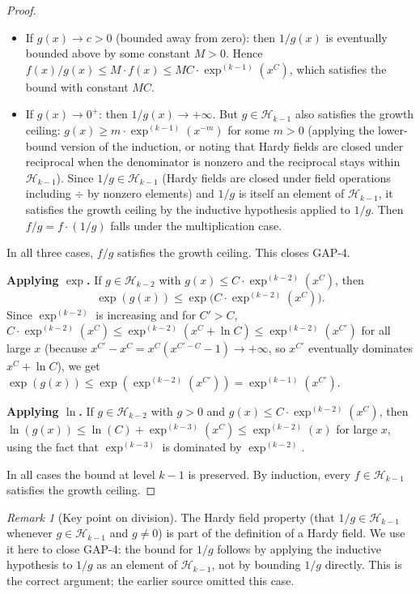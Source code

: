 \documentclass[12pt,a4paper]{article}
\theoremstyle{definition}
\theoremstyle{remark}
\newtheorem{remark}[theorem]{Remark}
\begin{document}
\begin{proof}
\begin{itemize}
  \item If $g(x) \to c > 0$ (bounded away from zero): then $1/g(x)$ is
        eventually bounded above by some constant $M > 0$.  Hence
        $f(x)/g(x) \leq M \cdot f(x) \leq MC \cdot \exp^{(k-1)}(x^C)$,
        which satisfies the bound with constant $MC$.

  \item If $g(x) \to 0^+$: then $1/g(x) \to +\infty$.  But $g \in \mathcal{H}_{k-1}$
        also satisfies the growth ceiling: $g(x) \geq m \cdot \exp^{(k-1)}(x^{-m})$
        for some $m > 0$ (applying the lower-bound version of the induction, or noting
        that Hardy fields are closed under reciprocal when the denominator is nonzero
        and the reciprocal stays within $\mathcal{H}_{k-1}$).  Since
        $1/g \in \mathcal{H}_{k-1}$ (Hardy fields are closed under field operations
        including $\div$ by nonzero elements) and $1/g$ is itself an element of
        $\mathcal{H}_{k-1}$, it satisfies the growth ceiling by the inductive hypothesis
        applied to $1/g$.  Then $f/g = f \cdot (1/g)$ falls under the multiplication case.
\end{itemize}

In all three cases, $f/g$ satisfies the growth ceiling.  This closes GAP-4.

\medskip
\noindent\textbf{Applying $\exp$.}
If $g \in \mathcal{H}_{k-2}$ with $g(x) \leq C \cdot \exp^{(k-2)}(x^C)$, then
\[
  \exp(g(x)) \leq \exp\bigl(C \cdot \exp^{(k-2)}(x^C)\bigr).
\]
Since $\exp^{(k-2)}$ is increasing and for $C' > C$,
$C \cdot \exp^{(k-2)}(x^C) \leq \exp^{(k-2)}(x^C + \ln C) \leq \exp^{(k-2)}(x^{C'})$
for all large $x$ (because $x^{C'} - x^C = x^C(x^{C'-C}-1) \to +\infty$, so
$x^{C'}$ eventually dominates $x^C + \ln C$), we get
$\exp(g(x)) \leq \exp(\exp^{(k-2)}(x^{C'})) = \exp^{(k-1)}(x^{C'})$.

\medskip
\noindent\textbf{Applying $\ln$.}
If $g \in \mathcal{H}_{k-2}$ with $g > 0$ and $g(x) \leq C \cdot \exp^{(k-2)}(x^C)$, then
$\ln(g(x)) \leq \ln(C) + \exp^{(k-3)}(x^C) \leq \exp^{(k-2)}(x)$ for large $x$,
using the fact that $\exp^{(k-3)}$ is dominated by $\exp^{(k-2)}$.

In all cases the bound at level $k-1$ is preserved.  By induction, every
$f \in \mathcal{H}_{k-1}$ satisfies the growth ceiling.
\end{proof}

\begin{remark}[Key point on division]
The Hardy field property (that $1/g \in \mathcal{H}_{k-1}$ whenever
$g \in \mathcal{H}_{k-1}$ and $g \neq 0$) is part of the definition of a Hardy field.
We use it here to close GAP-4: the bound for $1/g$ follows by applying the inductive
hypothesis to $1/g$ as an element of $\mathcal{H}_{k-1}$, not by bounding $1/g$
directly.  This is the correct argument; the earlier source omitted this case.
\end{remark}
\end{document}
